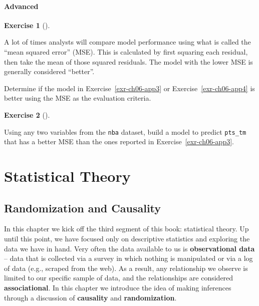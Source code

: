 \documentclass[
  letterpaper,
  DIV=11,
  numbers=noendperiod]{scrreprt}
\theoremstyle{definition}
\newtheorem{exercise}{Exercise}[chapter]
\theoremstyle{remark}
\begin{document}
\hypertarget{sec-ex06-advanced}{%
\subsection{Advanced}\label{sec-ex06-advanced}}

\leavevmode{}%
\begin{exercise}[]\label{exr-ch06-adv1}

A lot of times analysts will compare model performance using what is
called the ``mean squared error'' (MSE). This is calculated by first
squaring each residual, then take the mean of those squared residuals.
The model with the lower MSE is generally considered ``better''.

Determine if the model in Exercise~\ref{exr-ch06-app3} or
Exercise~\ref{exr-ch06-app4} is better using the MSE as the evaluation
criteria.

\end{exercise}

\leavevmode{}%
\begin{exercise}[]\label{exr-ch06-adv2}

Using any two variables from the \texttt{nba} dataset, build a model to
predict \texttt{pts\_tm} that has a better MSE than the ones reported in
Exercise~\ref{exr-ch06-app3}.

\end{exercise}

\part{Statistical Theory}

\hypertarget{sec-causality}{%
\chapter{Randomization and Causality}\label{sec-causality}}

In this chapter we kick off the third segment of this book: statistical
theory. Up until this point, we have focused only on descriptive
statistics and exploring the data we have in hand. Very often the data
available to us is \textbf{observational data} -- data that is collected
via a survey in which nothing is manipulated or via a log of data (e.g.,
scraped from the web). As a result, any relationship we observe is
limited to our specific sample of data, and the relationships are
considered \textbf{associational}. In this chapter we introduce the idea
of making inferences through a discussion of \textbf{causality} and
\textbf{randomization}.
\end{document}
